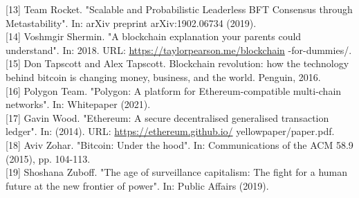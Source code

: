 \documentclass[10pt]{article}
\begin{document}
[13] Team Rocket. "Scalable and Probabilistic Leaderless BFT Consensus through Metastability". In: arXiv preprint arXiv:1902.06734 (2019).\\[0pt]
[14] Voshmgir Shermin. "A blockchain explanation your parents could understand". In: 2018. URL: \href{https://taylorpearson.me/blockchain}{https://taylorpearson.me/blockchain} -for-dummies/.\\[0pt]
[15] Don Tapscott and Alex Tapscott. Blockchain revolution: how the technology behind bitcoin is changing money, business, and the world. Penguin, 2016.\\[0pt]
[16] Polygon Team. "Polygon: A platform for Ethereum-compatible multi-chain networks". In: Whitepaper (2021).\\[0pt]
[17] Gavin Wood. "Ethereum: A secure decentralised generalised transaction ledger". In: (2014). URL: \href{https://ethereum.github.io/}{https://ethereum.github.io/} yellowpaper/paper.pdf.\\[0pt]
[18] Aviv Zohar. "Bitcoin: Under the hood". In: Communications of the ACM 58.9 (2015), pp. 104-113.\\[0pt]
[19] Shoshana Zuboff. "The age of surveillance capitalism: The fight for a human future at the new frontier of power". In: Public Affairs (2019).
\end{document}
